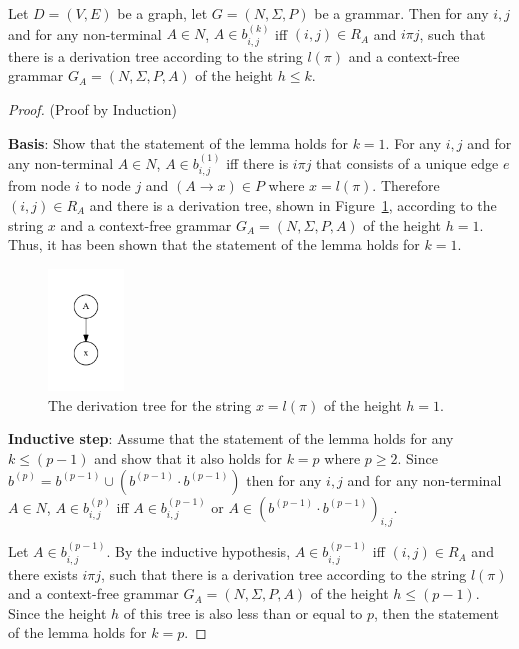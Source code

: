 \begin{lemma}\label{lemma:cf}
Let $D = (V,E)$ be a graph, let $G =(N,\Sigma,P)$ be a grammar. Then for any $i, j$ and for any non-terminal $A \in N$, $A \in b^{(k)}_{i,j}$ iff $(i,j) \in R_A$ and $i \pi j$, such that there is a derivation tree according to the string $l(\pi)$ and a context-free grammar $G_A = (N,\Sigma,P,A)$ of the height $h \leq k$.
\end{lemma}
\begin{proof}(Proof by Induction)

\textbf{Basis}: Show that the statement of the lemma holds for $k = 1$. For any $i, j$ and for any non-terminal $A \in N$, $A \in b^{(1)}_{i,j}$ iff there is $i \pi j$ that consists of a unique edge $e$ from node $i$ to node $j$ and $(A \rightarrow x) \in P$ where $x = l(\pi)$. Therefore $(i,j) \in R_A$ and there is a derivation tree, shown in Figure~\ref{tree1}, according to the string $x$ and a context-free grammar $G_A = (N,\Sigma,P,A)$ of the height $h = 1$. Thus, it has been shown that the statement of the lemma holds for $k = 1$.

\begin{figure}[h!]
 \centering
 \includegraphics[width=2cm]{pictures/tree1.pdf}
 \caption{The derivation tree for the string $x = l(\pi)$ of the height $h = 1$.}
 \label{tree1}
\end{figure}

\textbf{Inductive step}: Assume that the statement of the lemma holds for any $k \leq (p - 1)$ and show that it also holds for $k = p$ where $p \geq 2$. Since $b^{(p)} = b^{(p-1)} \cup (b^{(p-1)} \cdot b^{(p-1)})$ then for any $i, j$ and for any non-terminal $A \in N$, $A \in b^{(p)}_{i,j}$ iff $A \in b^{(p-1)}_{i,j}$ or $A \in (b^{(p-1)} \cdot b^{(p-1)})_{i,j}$.

Let $A \in b^{(p-1)}_{i,j}$. By the inductive hypothesis, $A \in b^{(p-1)}_{i,j}$ iff $(i,j) \in R_A$ and there exists $i \pi j$, such that there is a derivation tree according to the string $l(\pi)$ and a context-free grammar $G_A = (N,\Sigma,P,A)$ of the height $h \leq (p-1)$. Since the height $h$ of this tree is also less than or equal to $p$, then the statement of the lemma holds for $k = p$.


\end{proof}
